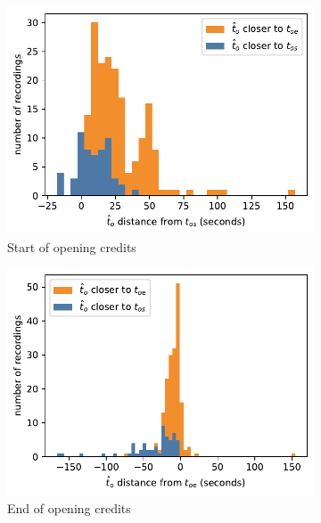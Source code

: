 \begin{figure}[h]
    \begin{subfigure}[t]{.49\textwidth}
      \centering
      \includegraphics[width=\linewidth]{../plots/distances/pelt_l2_dist_start_first.pdf}
      \caption{Start of opening credits}
      \label{fig:t_diff_os}
    \end{subfigure}
    \hfill
    \begin{subfigure}[t]{.49\textwidth}
      \centering
      \includegraphics[width=\linewidth]{../plots/distances/pelt_l2_dist_start_last.pdf}
      \caption{End of opening credits}
      \label{fig:t_diff_oe}
    \end{subfigure}
    \begin{subfigure}[t]{.49\textwidth}

\end{subfigure}
\end{figure}
